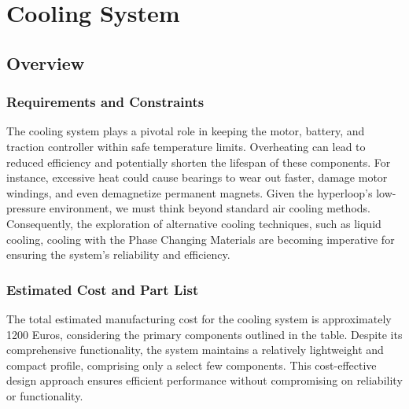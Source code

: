 
\section{Cooling System} 
\subsection{Overview}
\subsubsection{Requirements and Constraints}
The cooling system plays a pivotal role in keeping the motor, battery, and traction controller within safe temperature limits. Overheating can lead to reduced efficiency and potentially shorten the lifespan of these components. For instance, excessive heat could cause bearings to wear out faster, damage motor windings, and even demagnetize permanent magnets. Given the hyperloop's low-pressure environment, we must think beyond standard air cooling methods. Consequently, the exploration of alternative cooling techniques, such as liquid cooling, cooling with the Phase Changing Materials are becoming imperative for ensuring the system's reliability and efficiency.

\subsubsection{Estimated Cost and Part List}
The total estimated manufacturing cost for the cooling system is approximately 1200 Euros, considering the primary components outlined in the table. Despite its comprehensive functionality, the system maintains a relatively lightweight and compact profile, comprising only a select few components. This cost-effective design approach ensures efficient performance without compromising on reliability or functionality.


